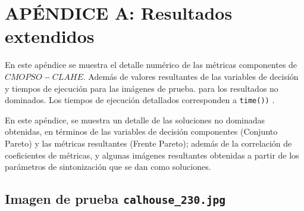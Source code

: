 \renewcommand\thesection{A.\arabic{figure}}
\renewcommand\thefigure{\thesection}
\renewcommand{\thetable}{A.\arabic{table}} 

\chapter{APÉNDICE A: Resultados extendidos}
\label{ch:anexo}
\setcounter{figure}{0}
\setcounter{table}{0} 
En este apéndice se muestra el detalle numérico de las métricas componentes de $CMOPSO-CLAHE$. Además de valores resultantes de las variables de decisión y tiempos de ejecución para las imágenes de prueba. para los resultados no dominados. Los tiempos de ejecución detallados corresponden a \texttt{time())} \cite{time}.

En este apéndice, se muestra un detalle de las soluciones no dominadas obtenidas, en términos de las variables de decisión componentes (Conjunto Pareto) y las métricas resultantes (Frente Pareto); además de la correlación de coeficientes de métricas, y algunas imágenes resultantes obtenidas a partir de los parámetros de sintonización que se dan como soluciones.


\section*{Imagen de prueba \texttt{calhouse\_230.jpg}}

